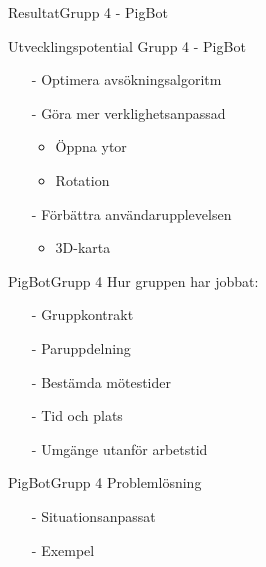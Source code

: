 \begin{frame}{Resultat}{Grupp 4 - PigBot}
\begin{center}
\end {center}
\end{frame}


\begin{frame}{Utvecklingspotential }{Grupp 4 - PigBot}

  \begin{itemize}
    \item[-] Optimera avsökningsalgoritm
    \item[-] Göra mer verklighetsanpassad
	\begin{itemize}
	  \item Öppna ytor
	  \item Rotation
	\end{itemize}	
    \item[-] Förbättra användarupplevelsen
     	\begin{itemize}
	  \item 3D-karta
	\end{itemize}
   \end{itemize}
\end{frame}


\begin{frame}[fragile]{PigBot}{Grupp 4}
Hur gruppen har jobbat:
  \begin{itemize}
 \pause
    \item[-] Gruppkontrakt 
\pause
    \item[-] Paruppdelning
\pause
    \item[-] Bestämda mötestider
\pause
    \item[-] Tid och plats
\pause
    \item[-] Umgänge utanför arbetstid
  \end{itemize}
\end{frame}

\begin{frame}[fragile]{PigBot}{Grupp 4}
Problemlösning
  \begin{itemize}
 \pause
    \item[-] Situationsanpassat
\pause
    \item[-] Exempel
  \end{itemize}
\end{frame}

